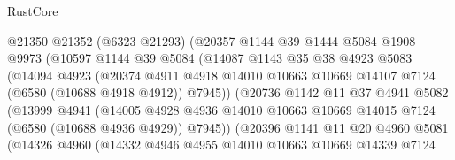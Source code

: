 \begin{lexlean}{RustCore}
\begin{coremodule}
                        @21350
                        @21352
                        (@6323 @21293)
                        (@20357
                          @1144
                          @39
                          @1444
                          @5084
                          @1908
                          @9973
                          (@10597
                            @1144
                            @39
                            @5084
                            (@14087
                              @1143
                              @35
                              @38
                              @4923
                              @5083
                              (@14094
                                @4923
                                (@20374
                                  @4911
                                  @4918
                                  @14010
                                  @10663
                                  @10669
                                  @14107
                                  @7124
                                  (@6580 (@10688 @4918 @4912))
                                  @7945))
                              (@20736
                                @1142
                                @11
                                @37
                                @4941
                                @5082
                                (@13999
                                  @4941
                                  (@14005
                                    @4928
                                    @4936
                                    @14010
                                    @10663
                                    @10669
                                    @14015
                                    @7124
                                    (@6580 (@10688 @4936 @4929))
                                    @7945))
                                (@20396
                                  @1141
                                  @11
                                  @20
                                  @4960
                                  @5081
                                  (@14326
                                    @4960
                                    (@14332
                                      @4946
                                      @4955
                                      @14010
                                      @10663
                                      @10669
                                      @14339
                                      @7124

\end{coremodule}
\end{lexlean}
